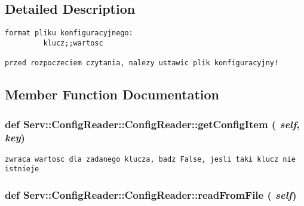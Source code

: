 \subsection{Detailed Description}


\footnotesize\begin{verbatim}
format pliku konfiguracyjnego: 
         klucz;;wartosc         

przed rozpoczeciem czytania, nalezy ustawic plik konfiguracyjny!

\end{verbatim}
\normalsize
 

\subsection{Member Function Documentation}
\hypertarget{class_serv_1_1_config_reader_1_1_config_reader_9679117d87cde62fd4243670089a11cc}{
\subsubsection[{getConfigItem}]{\setlength{\rightskip}{0pt plus 5cm}def Serv::ConfigReader::ConfigReader::getConfigItem ( {\em self}, \/   {\em key})}}
\label{class_serv_1_1_config_reader_1_1_config_reader_9679117d87cde62fd4243670089a11cc}




\footnotesize\begin{verbatim}zwraca wartosc dla zadanego klucza, badz False, jesli taki klucz nie istnieje

\end{verbatim}
\normalsize
 \hypertarget{class_serv_1_1_config_reader_1_1_config_reader_c8ff5305639fac5691feb7de4ae9ceea}{
\subsubsection[{readFromFile}]{\setlength{\rightskip}{0pt plus 5cm}def Serv::ConfigReader::ConfigReader::readFromFile ( {\em self})}}
\label{class_serv_1_1_config_reader_1_1_config_reader_c8ff5305639fac5691feb7de4ae9ceea}




